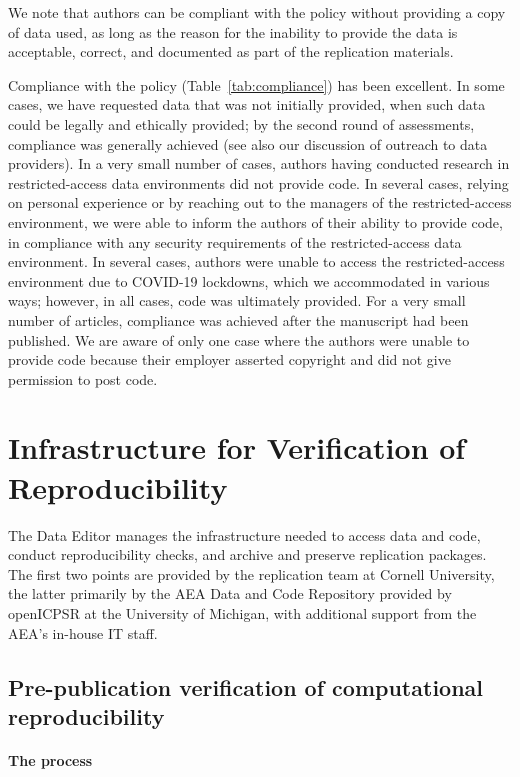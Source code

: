 \documentclass[PP]{AEA}
\newcommand{\aeadcr}{AEA Data and Code Repository}
\begin{document}
We note that authors can be compliant with the policy without providing a copy of data used, as long as the reason for the inability to provide the data is acceptable, correct, and documented as part of the replication materials. 

Compliance with the policy (Table~\ref{tab:compliance}) has been excellent. In some cases, we have requested data that was not initially provided, when such data could be legally and ethically provided; by the second round of assessments, compliance was generally achieved (see also our discussion of outreach to data providers). In a very small number of cases, authors having conducted research in restricted-access data environments did not provide code. In several cases, relying on personal experience or by reaching out to the managers of the restricted-access environment, we were able to inform the authors of their ability to provide code, in compliance with any security requirements of the restricted-access data environment. In several cases, authors were unable to access the restricted-access environment due to COVID-19 lockdowns, which we accommodated in various ways; however, in all cases, code was ultimately provided. For a very small number of articles, compliance was achieved after the manuscript had been published. We are aware of only one case where the authors were unable to provide code because their employer asserted copyright and did not give permission to post code. 


\section{Infrastructure for Verification of Reproducibility}
\label{sec:infrastructure}

The Data Editor manages the infrastructure needed to access data and code, conduct reproducibility checks, and archive and preserve replication packages. The first two points are provided by the replication team at Cornell University, the latter primarily by the  \aeadcr{} provided by openICPSR at the University of Michigan, with additional support from the AEA's in-house IT staff. 


\subsection{Pre-publication verification of computational reproducibility}
\label{sec:verification}

\paragraph{The process}
\end{document}
